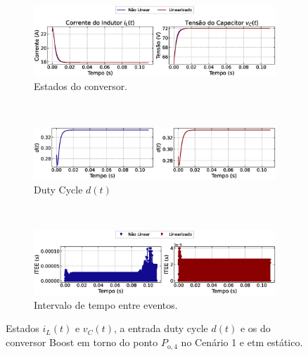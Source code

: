 \begin{figure}[H]
  \centering
  \captionsetup{justification=centering}
  \begin{subfigure}{1.\textwidth}
    \centering
    \includegraphics[width=1.\textwidth]{figuras/static-etm/boost/sim1/op2/result.eps}
    \caption{Estados do conversor.}
    \label{fig:boost_converter_constant_pcpl_static_etm_op2_duty_a}
  \end{subfigure}
  \\[6pt]
  \begin{subfigure}{1.\textwidth}
    \centering
    \includegraphics[width=1.\textwidth]{figuras/static-etm/boost/sim1/op2/duty-cycle.eps}
    \caption{Duty Cycle $d(t)$}
    \label{fig:boost_converter_constant_pcpl_static_etm_op2_duty_b}
  \end{subfigure}
  \\[6pt]
  \begin{subfigure}{1.\textwidth}
    \centering
    \includegraphics[width=1.\textwidth]{figuras/static-etm/boost/sim1/op2/inter-event-times.eps}
    \caption{Intervalo de tempo entre eventos.}
    \label{fig:boost_converter_constant_pcpl_static_etm_op2_duty_c}
  \end{subfigure}
  \caption{Estados $i_L(t)$ e $v_C(t)$, a entrada duty cycle $d(t)$ e os  do conversor Boost em torno do ponto $P_{\mathrm{o}, 4}$ no Cenário 1 e \acrshort{etm} estático.}
\end{figure}

